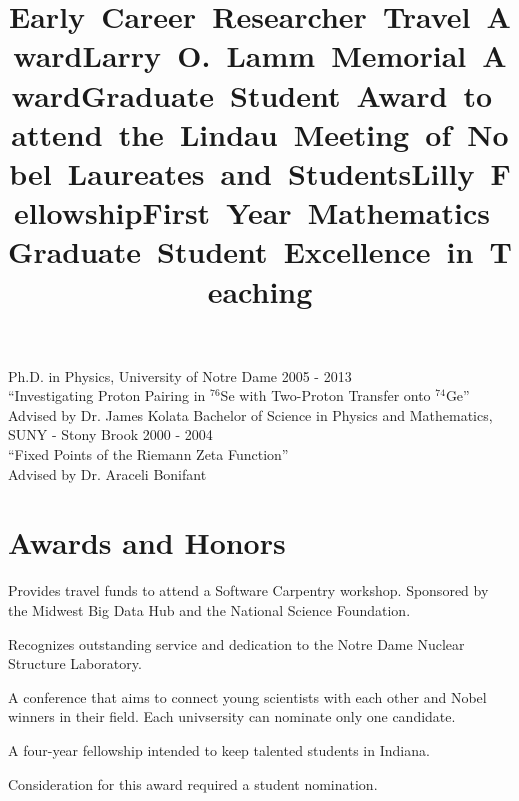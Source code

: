 \documentclass[overlapped,line,letterpaper]{res}
\begin{document}
\begin{resume}
Ph.D. in Physics, University of Notre Dame \hfill {2005 - 2013} \\
``Investigating Proton Pairing in $^{76}$Se with Two-Proton Transfer onto $^{74}$Ge'' \\
Advised by Dr. James Kolata
\vspace{3mm}
\newline
Bachelor of Science in Physics and Mathematics, SUNY - Stony Brook \hfill 2000 - 2004 \\
``Fixed Points of the Riemann Zeta Function'' \\
Advised by Dr. Araceli Bonifant


\section{\bf Awards and Honors}
\title{\mbox{Early Career Researcher Travel Award}}
\begin{position}
Provides travel funds to attend a Software Carpentry workshop.  Sponsored by the Midwest Big Data Hub and the National Science Foundation.
\end{position}

\title{\mbox{Larry O. Lamm Memorial Award}}
\begin{position}
Recognizes outstanding service and dedication to the Notre Dame Nuclear Structure Laboratory.
\end{position}

\title{\mbox{Graduate Student Award to attend the Lindau Meeting of Nobel Laureates and Students}}
\begin{position}
A conference that aims to connect young scientists with each other and Nobel winners in their field.  Each univsersity can nominate only one candidate.
\end{position}

\title{\mbox{Lilly Fellowship}}
\begin{position}
A four-year fellowship intended to keep talented students in Indiana.
\end{position}

\title{\mbox{First Year Mathematics Graduate Student Excellence in Teaching}}
\begin{position}
Consideration for this award required a student nomination.
\end{position}


\end{resume}
\end{document}
